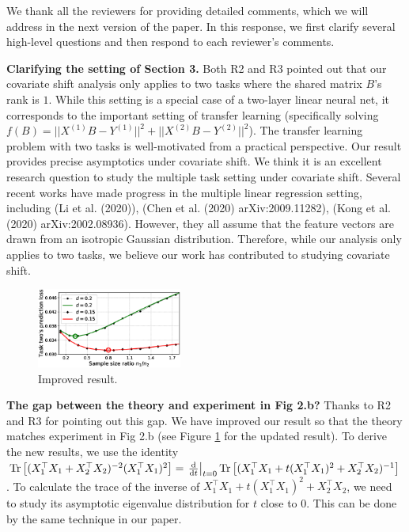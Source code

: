 \documentclass{article}
\begin{document}
	We thank all the reviewers for providing detailed comments, which we will address in the next version of the paper.
	In this response, we first clarify several high-level questions and then respond to each reviewer's comments.

	\textbf{Clarifying the setting of Section 3.} Both R2 and R3 pointed out that our covariate shift analysis only applies to two tasks where the shared matrix $B$'s rank is $1$.
	While this setting is a special case of a two-layer linear neural net, it corresponds to the important setting of transfer learning (specifically solving $f(B) = ||X^{(1)} B - Y^{(1)}||^2 + ||X^{(2)} B - Y^{(2)}||^2$).
	The transfer learning problem with two tasks is well-motivated from a practical perspective.
	Our result provides precise asymptotics under covariate shift.
	We think it is an excellent research question to study the multiple task setting under covariate shift.
	Several recent works have made progress in the multiple linear regression setting, including (Li et al. (2020)), (Chen et al. (2020) arXiv:2009.11282), (Kong et al. (2020) arXiv:2002.08936).
	However, they all assume that the feature vectors are drawn from an isotropic Gaussian distribution.
	Therefore, while our analysis only applies to two tasks, we believe our work has contributed to studying covariate shift.



	\begin{figure}
			\vspace{-0.2in}
		\caption{Improved result.}\label{fig_update}
		\includegraphics[width=4.75cm]{sample_ratio_several_d.eps}
		\vspace{-0.4in}
	\end{figure}


\textbf{The gap between the theory and experiment in Fig 2.b?} Thanks to R2 and R3 for pointing out this gap.
	We have improved our result so that the theory matches experiment in Fig 2.b (see Figure \ref{fig_update} for the updated result).
	To derive the new results, we use the identity $\operatorname{Tr}\left[(X_1^\top X_1 + X_2^\top X_2)^{-2}(X_1^\top X_1)^2\right]= \left.\frac{\rm{d}}{{\rm d} t}\right|_{t=0} \operatorname{Tr}\left[(X_1^\top X_1 + t(X_1^\top X_1)^2 + X_2^\top X_2)^{-1}\right]$. To calculate the trace of the inverse of $X_1^\top X_1 + t(X_1^\top X_1)^2 + X_2^\top X_2$, we need to study its asymptotic eigenvalue distribution for $t$ close to 0. This can be done by the same technique in our paper.  %
\end{document}
